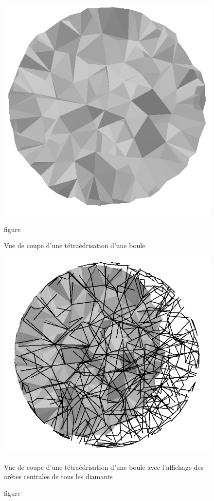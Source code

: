 \documentclass[a4paper,11pt,openany]{article}
\begin{document}
\begin{figure}[H]
\centering
\begin{minipage}{.5\textwidth}
  \centering
  \includegraphics[scale=0.2]{Images/half_ball}
  \caption{figure}{Vue de coupe d'une tétraèdrisation d'une boule}
  \label{fig:half_ball}
\end{minipage}%
\begin{minipage}{.5\textwidth}
  \centering
  \includegraphics[scale=0.2]{Images/central_edges}
  \caption{figure}{Vue de coupe d'une tétraèdrisation d'une boule avec l'affichage des arêtes centrales de tous les diamants}
  \label{fig:central_edges}
\end{minipage}
\end{figure}
\end{document}
